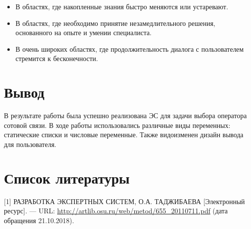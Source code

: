 \documentclass[14pt,a4paper,report]{report}
\begin{document}
\begin{itemize}
	\item В областях, где накопленные знания быстро меняются или устаревают.
	\item В областях, где необходимо принятие незамедлительного решения, основанного на опыте и умении специалиста.
	\item В очень широких областях, где продолжительность диалога с пользователем стремится к бесконечности.
\end{itemize}

\section{Вывод}

В результате работы была успешно реализована ЭС для задачи выбора оператора сотовой связи. В ходе работы использовались различные виды переменных: статические списки и числовые переменные. Также видоизменен дизайн вывода для пользователя.



\section{Список литературы}


\begin{flushleft}
	
[1] РАЗРАБОТКА ЭКСПЕРТНЫХ СИСТЕМ, О.А. ТАДЖИБАЕВА [Электронный ресурс]. — URL: \href{http://artlib.osu.ru/web/metod/655_20110711.pdf}{http://artlib.osu.ru/web/metod/655\_20110711.pdf} (дата обращения 21.10.2018). \linebreak

\end{flushleft}
	
\end{document}
